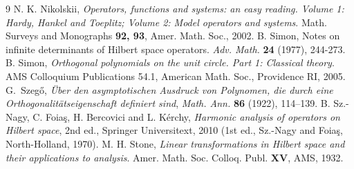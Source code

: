\documentclass[11pt]{article}
\begin{document}
\begin{thebibliography}{9}
 N. K. Nikolskii, {\sl Operators, functions and systems: an easy reading.  Volume 1: Hardy, Hankel and Toeplitz; Volume 2: Model operators and systems}.  Math. Surveys and Monographs {\bf 92, 93}, Amer. Math. Soc., 2002. 
 B. Simon, Notes on infinite determinants of Hilbert space operators. {\sl Adv. Math.} {\bf{24}} (1977), 244-273.
 B. Simon, {\sl Orthogonal polynomials on the unit circle.  Part 1: Classical theory}. AMS Colloquium Publications 54.1, American Math. Soc., Providence RI, 2005.
 G.~Szeg\H{o}, \emph{\"Uber den asymptotischen Ausdruck von Polynomen, die
durch eine Orthogonalit\"atseigenschaft definiert sind},
\emph{Math. Ann.} \textbf{86} (1922), 114--139.
 B. Sz.-Nagy, C. Foia\c s, H. Bercovici and L. K\'erchy, {\sl Harmonic analysis of operators on Hilbert space}, 2nd ed., Springer Universitext, 2010 (1st ed., Sz.-Nagy and Foia\c s, North-Holland, 1970).
 M. H. Stone, {\sl Linear transformations in Hilbert space and their applications to analysis}.  Amer. Math. Soc. Colloq. Publ. {\bf XV}, AMS, 1932. 

\end{thebibliography}
\end{document}
